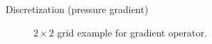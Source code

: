 \documentclass{beamer}
\begin{document}
	\begin{frame}{Discretization (pressure gradient)}
		\begin{figure}[H] %
		  \caption{$2\times 2$ grid example for gradient operator.}\label{fig:G-example-2x2}
		\end{figure}
	\end{frame}
	
\end{document}
